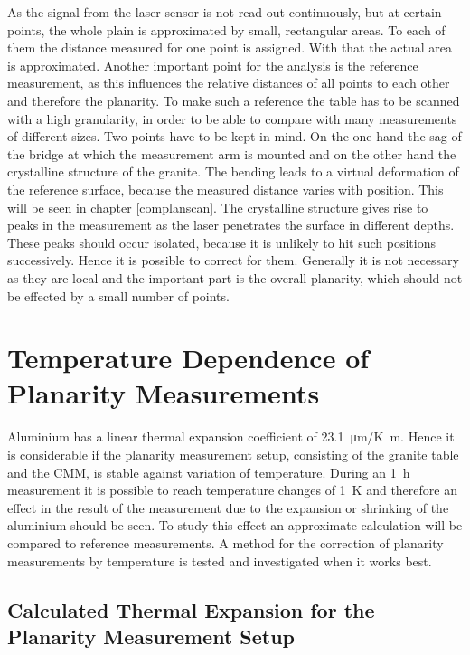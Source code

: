 \documentclass[
a4paper,                                %
twoside,                                %
BCOR1.4cm,                      %
10pt,                           %
headings=normal,                %
headsepline,                    %
clearplainpage, %
final,                                  %
div=14,
parskip=full,
openright,
bibliography=toc
]{scrreprt}
\begin{document}
As the signal from the laser sensor is not read out continuously, but at certain points, the whole plain is approximated by small, rectangular areas. To each of them the distance measured for one point is assigned. With that the actual area is approximated. Another important point for the analysis is the reference measurement, as this influences the relative distances of all points to each other and therefore the planarity. To make such a reference the table has to be scanned with a high granularity, in order to be able to compare with many measurements of different sizes. Two points have to be kept in mind. On the one hand the sag of the bridge at which the measurement arm is mounted and on the other hand the crystalline structure of the granite. The bending leads to a virtual deformation of the reference surface, because the measured distance varies with position. This will be seen in chapter \ref{complanscan}. The crystalline structure gives rise to peaks in the measurement as the laser penetrates the surface in different depths. These peaks should occur isolated, because it is unlikely to hit such positions successively. Hence it is possible to correct for them. Generally it is not necessary as they are local and the important part is the overall planarity, which should not be effected by a small number of points.

\chapter{Temperature Dependence of Planarity Measurements}

Aluminium has a linear thermal expansion coefficient of \SI{23.1}{\micro\m/\K\m}. Hence it is considerable if the planarity measurement setup, consisting of the granite table and the CMM, is stable against variation of temperature. During an \SI{1}{\hour} measurement it is possible to reach temperature changes of \SI{1}{\K} and therefore an effect in the result of the measurement due to the expansion or shrinking of the aluminium should be seen. To study this effect an approximate calculation will be compared to reference measurements. A method for the correction of planarity measurements by temperature is tested and investigated when it works best.

\section{Calculated Thermal Expansion for the Planarity Measurement Setup}\label{calcThermExp}
\end{document}
